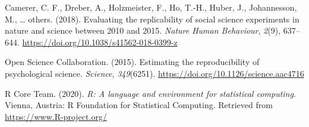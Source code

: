 \documentclass[
  english,
  man]{apa6}
\begin{document}
\leavevmode\hypertarget{ref-camerer2018evaluating}{}%
Camerer, C. F., Dreber, A., Holzmeister, F., Ho, T.-H., Huber, J., Johannesson, M., \ldots{} others. (2018). Evaluating the replicability of social science experiments in nature and science between 2010 and 2015. \emph{Nature Human Behaviour}, \emph{2}(9), 637--644. \url{https://doi.org/10.1038/s41562-018-0399-z}

\leavevmode\hypertarget{ref-open2015estimating}{}%
Open Science Collaboration. (2015). Estimating the reproducibility of psychological science. \emph{Science}, \emph{349}(6251). \url{https://doi.org/10.1126/science.aac4716}

\leavevmode\hypertarget{ref-R-base}{}%
R Core Team. (2020). \emph{R: A language and environment for statistical computing}. Vienna, Austria: R Foundation for Statistical Computing. Retrieved from \url{https://www.R-project.org/}

\endgroup
\end{document}
